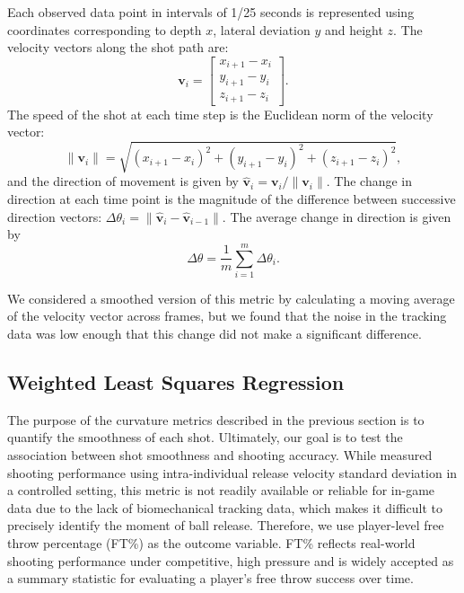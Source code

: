 \documentclass{article}
\begin{document}
      Each observed data point in intervals of 1/25 seconds is represented using coordinates corresponding to depth \(x\), lateral deviation \(y\) and height \(z\). The velocity vectors along the shot path are:
      \[
        \mathbf{v}_i = \begin{bmatrix} x_{i+1} - x_i \\ y_{i+1} - y_i \\ z_{i+1} - z_i \end{bmatrix}.
      \]
      The speed of the shot at each time step is the Euclidean norm of the velocity vector:
      \[
        \|\mathbf{v}_i\| = \sqrt{(x_{i+1} - x_i)^2 + (y_{i+1} - y_i)^2 + (z_{i+1} - z_i)^2},
      \]
      and the direction of movement is given by \(\mathbf{\hat{v}}_i = \mathbf{v}_i / \|\mathbf{v}_i\| \). The change in direction at each time point is the magnitude of the difference between successive direction vectors: \(\Delta \theta_i = \|\mathbf{\hat{v}}_i - \mathbf{\hat{v}}_{i-1}\|\). The average change in direction is given by
      \[
        \Delta \theta = \frac{1}{m} \sum_{i=1}^{m} \Delta \theta_i.
      \]

      We considered a smoothed version of this metric by calculating a moving average of the velocity vector across frames, but we found that the noise in the tracking data was low enough that this change did not make a significant difference.
      
    \subsection{Weighted Least Squares Regression}

      The purpose of the curvature metrics described in the previous section is to quantify the smoothness of each shot. Ultimately, our goal is to test the association between shot smoothness and shooting accuracy. While \citet{slegers_role_2024} measured shooting performance using intra-individual release velocity standard deviation in a controlled setting, this metric is not readily available or reliable for in-game data due to the lack of biomechanical tracking data, which makes it difficult to precisely identify the moment of ball release. Therefore, we use player-level free throw percentage (FT\%) as the outcome variable. FT\% reflects real-world shooting performance under competitive, high pressure and is widely accepted as a summary statistic for evaluating a player’s free throw success over time.
\end{document}
